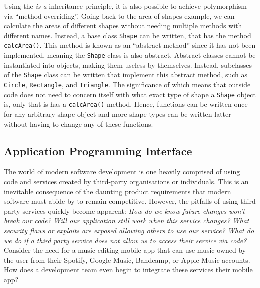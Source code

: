 \documentclass[11pt]{article}
\begin{document}
Using the \textit{is-a} inheritance principle, it is also possible to achieve polymorphism via ``method overriding''. Going back to the area of shapes example, we can calculate the areas of different shapes without needing multiple methods with different names. Instead, a base \gls{class} \texttt{Shape} can be written, that has the method \texttt{calcArea()}. This method is known as an ``abstract method'' since it has not been implemented, meaning the \texttt{Shape} \gls{class} is also abstract. Abstract classes cannot be instantiated into \glspl{object}, making them useless by themselves. Instead, subclasses of the \texttt{Shape} \gls{class} can be written that implement this abstract method, such as \texttt{Circle}, \texttt{Rectangle}, and \texttt{Triangle}. The significance of which means that outside code does not need to concern itself with what exact type of shape a \texttt{Shape} \gls{object} is, only that is has a \texttt{calcArea()} method. Hence, functions can be written once for any arbitrary shape \gls{object} and more shape types can be written latter without having to change any of these functions.

\subsection{Application Programming Interface}

The world of modern software development is one heavily comprised of using code and services created by third-party organisations or individuals. This is an inevitable consequence of the daunting product requirements that modern software must abide by to remain competitive. However, the pitfalls of using third party services quickly become apparent: \textit{How do we know future changes won't break our code? Will our application still work when this service changes? What security flaws or exploits are exposed allowing others to use our service? What do we do if a third party service does not allow us to access their service via code?} Consider the need for a music editing mobile app that can use music owned by the \gls{user} from their Spotify, Google Music, Bandcamp, or Apple Music accounts. How does a development team even begin to integrate these services their mobile app?
\end{document}
